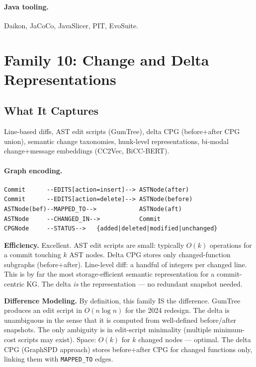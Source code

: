 \documentclass[12pt,a4paper]{article}
\begin{document}
\paragraph{Java tooling.} Daikon, JaCoCo, JavaSlicer, PIT, EvoSuite.

\section{Family 10: Change and Delta Representations}

\subsection{What It Captures}

Line-based diffs, AST edit scripts (GumTree), delta CPG (before+after CPG
union), semantic change taxonomies, hunk-level representations, bi-modal
change+message embeddings (CC2Vec, BiCC-BERT).

\paragraph{Graph encoding.}
\begin{lstlisting}
Commit      --EDITS[action=insert]--> ASTNode(after)
Commit      --EDITS[action=delete]--> ASTNode(before)
ASTNode(bef)--MAPPED_TO-->            ASTNode(aft)
ASTNode     --CHANGED_IN-->           Commit
CPGNode     --STATUS-->   {added|deleted|modified|unchanged}
\end{lstlisting}

\begin{effbox}
\textbf{Efficiency.}
Excellent. AST edit scripts are small: typically $O(k)$ operations for a commit
touching $k$ AST nodes. Delta CPG stores only changed-function subgraphs
(before+after). Line-level diff: a handful of integers per changed line.
This is by far the most storage-efficient semantic representation for a
commit-centric KG. The delta \emph{is} the representation --- no redundant
snapshot needed.
\end{effbox}

\begin{diffbox}
\textbf{Difference Modeling.}
By definition, this family IS the difference. GumTree produces an edit script
in $O(n \log n)$ for the 2024 redesign. The delta is unambiguous in the sense
that it is computed from well-defined before/after snapshots. The only
ambiguity is in edit-script minimality (multiple minimum-cost scripts may
exist). Space: $O(k)$ for $k$ changed nodes --- optimal. The delta CPG
(GraphSPD approach) stores before+after CPG for changed functions only,
linking them with \texttt{MAPPED\_TO} edges.
\end{diffbox}
\end{document}
